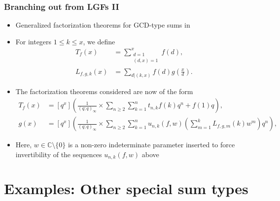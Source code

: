 \begin{frame}

\frametitle{Branching out from LGFs II}

\begin{itemize} 

\item Generalized factorization theorems for GCD-type sums in 
      \cite{MOUSAVI-SCHMIDT-2019}
\pause\item For integers $1 \leq k \leq x$, we define 
      {\scriptsize
      \begin{align} 
      \tag{Type I Sums}
      T_{f}(x) & = \sum_{\substack{d=1 \\ (d,x)=1}}^x f(d), \\ 
      \tag{Type II Sums}
      L_{f,g,k}(x) & = \sum_{d|(k,x)} f(d) g\left(\frac{x}{d}\right). 
      \end{align}
      }
\pause\item The factorization theorems considered are now of the form 
      {\tiny
      \begin{align*}
      T_{f}(x) & = [q^x]\left(\frac{1}{(q; q)_{\infty}} \times \sum_{n \geq 2} \sum_{k=1}^n t_{n,k} f(k) q^n + 
           f(1) q\right), \\ 
      g(x) & = [q^x]\left(\frac{1}{(q; q)_{\infty}} \times 
           \sum_{n \geq 2} \sum_{k=1}^n u_{n,k}(f, w) \left(
           \sum_{m=1}^k L_{f,g,m}(k) w^m\right) q^n\right), 
      \end{align*}
      }
\pause\item Here, $w \in \mathbb{C} \setminus \{0\}$ is a non-zero indeterminate parameter inserted to force 
      invertibility of the sequences $u_{n,k}(f, w)$ above

\end{itemize}

\end{frame}

\section{Examples: Other special sum types}

